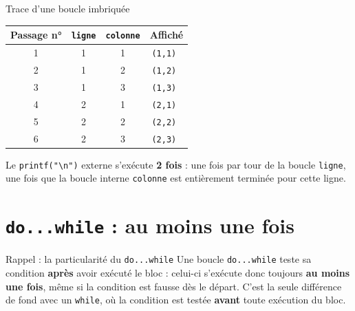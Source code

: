 \begin{UPSTIprofOnlyEnv}
    \begin{UPSTIcorrectionP}{Trace d'une boucle imbriquée}
        \begin{center}
            \begin{tabular}{|c|c|c|c|}
                \hline
                \textbf{Passage n°} & \texttt{ligne} & \texttt{colonne} & \textbf{Affiché} \\
                \hline
                1 & 1 & 1 & \texttt{(1,1) } \\
                \hline
                2 & 1 & 2 & \texttt{(1,2) } \\
                \hline
                3 & 1 & 3 & \texttt{(1,3) } \\
                \hline
                4 & 2 & 1 & \texttt{(2,1) } \\
                \hline
                5 & 2 & 2 & \texttt{(2,2) } \\
                \hline
                6 & 2 & 3 & \texttt{(2,3) } \\
                \hline
            \end{tabular}
        \end{center}
        Le \texttt{printf("\textbackslash n")} externe s'exécute \textbf{2 fois} : une fois par tour de la boucle \texttt{ligne}, une fois que la boucle interne \texttt{colonne} est entièrement terminée pour cette ligne.
    \end{UPSTIcorrectionP}
\end{UPSTIprofOnlyEnv}


\section{\texttt{do...while} : au moins une fois}

\begin{UPSTIinfor}{Rappel : la particularité du \texttt{do...while}}
    Une boucle \texttt{do...while} teste sa condition \textbf{après} avoir exécuté le bloc : celui-ci s'exécute donc toujours \textbf{au moins une fois}, même si la condition est fausse dès le départ. C'est la seule différence de fond avec un \texttt{while}, où la condition est testée \textbf{avant} toute exécution du bloc.
\end{UPSTIinfor}

